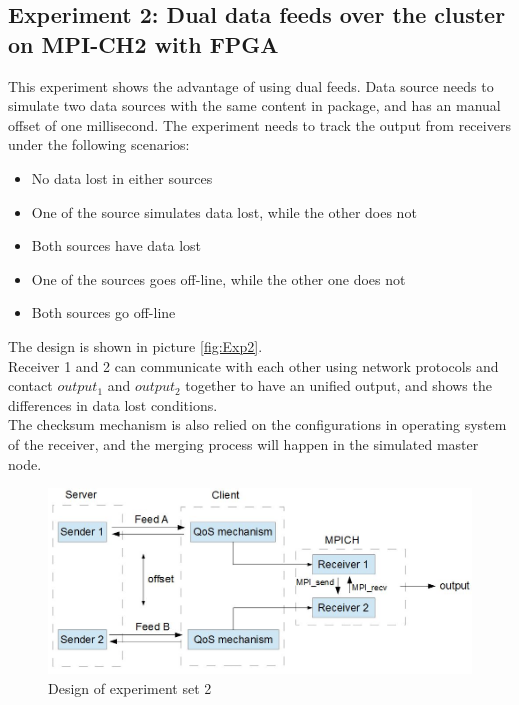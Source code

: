 \documentclass[11pt,openright,a4paper]{report}
\begin{document}
\subsection{Experiment 2: Dual data feeds over the cluster on MPI-CH2 with FPGA}
This experiment shows the advantage of using dual feeds. Data source needs to simulate two data sources with the same content in package, and has an manual offset of one millisecond. The experiment needs to track the output from receivers under the following scenarios:
\begin{itemize}
	\item No data lost in either sources
	\item One of the source simulates data lost, while the other does not
	\item Both sources have data lost
	\item One of the sources goes off-line, while the other one does not
	\item Both sources go off-line
\end{itemize}
The design is shown in picture \ref{fig:Exp2}.\\
Receiver 1 and 2 can communicate with each other using network protocols and contact $output_{1}$ and $output_{2}$ together to have an unified output, and shows the differences in data lost conditions.\\
The checksum mechanism is also relied on the configurations in operating system of the receiver, and the merging process will happen in the simulated master node.\\ 
\begin{figure}[H]
	\centering
	\includegraphics[width=0.8\linewidth]{picture/exp3}
	\caption{Design of experiment set 2}
	\label{fig:exp3}
\end{figure}
\end{document}
